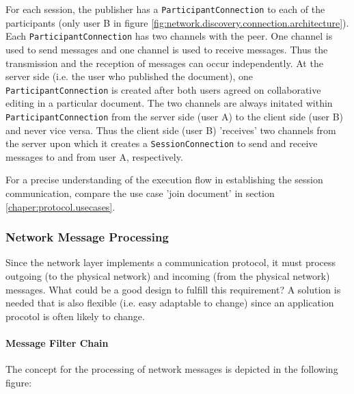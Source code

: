 For each session, the publisher has a \texttt{ParticipantConnection} to each of the participants (only user B in figure \ref{fig:network.discovery.connection.architecture}). Each \texttt{ParticipantConnection} has two channels with the peer. One channel is used to send messages and one channel is used to receive messages. Thus the transmission and the reception of messages can occur independently. At the server side (i.e. the user who published the document), one \texttt{ParticipantConnection} is created after both users agreed on collaborative editing in a particular document. The two channels are always initated within \texttt{ParticipantConnection} from the server side (user A) to the client side (user B) and never vice versa. Thus the client side (user B) 'receives' two channels from the server upon which it creates a \texttt{SessionConnection} to send and receive messages to and from user A, respectively.

For a precise understanding of the execution flow in establishing the session communication, compare the use case 'join document' in section \ref{chaper:protocol.usecases}.


\subsubsection{Network Message Processing}
Since the network layer implements a communication protocol, it must process outgoing (to the physical network) and incoming (from the physical network) messages. What could be a good design to fulfill this requirement? A solution is needed that is also flexible (i.e. easy adaptable to change) since an application procotol is often likely to change.

\paragraph{Message Filter Chain}
The concept for the processing of network messages is depicted in the following figure:

